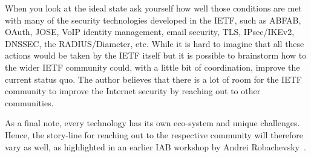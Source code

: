 \documentclass[peerreview, a4paper, 7pt]{IEEEtran}
\begin{document}
When you look at the ideal state ask yourself how well those conditions are met with many of the security technologies developed in the IETF, such as ABFAB, OAuth, JOSE, VoIP identity management, email security, TLS, IPsec/IKEv2, DNSSEC, the RADIUS/Diameter, etc. While it is hard to imagine that all these actions would be taken by the IETF itself but it is possible to brainstorm how to the wider IETF community could, with a little bit of coordination, improve the current status quo. The author believes that there is a lot of room for the IETF community to improve the Internet security by reaching out to other communities. 

As a final note, every technology has its own eco-system and unique challenges. Hence, the story-line for reaching out to the respective community will therefore vary as well, as highlighted in an earlier IAB workshop by Andrei Robachevsky~\cite{Robachevsky}. 
%

% 

\end{document}
